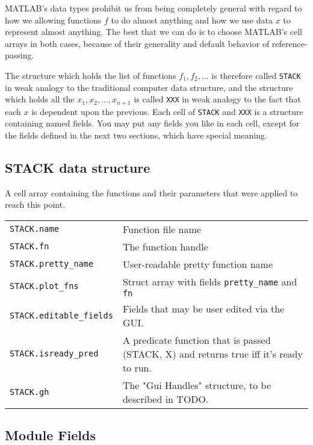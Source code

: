\documentclass{article}
\newcommand{\matlab}[1]{\texttt{#1}}
\begin{document}
MATLAB's data types prohibit us from being completely general with regard to how we allowing functions $f$ to do almost anything and how we use data $x$ to represent almost anything. The best that we can do is to choose MATLAB's cell arrays in both cases, because of their generality and default behavior of reference-passing.

The structure which holds the list of functions $f_1, f_2, ...$ is therefore called \matlab{STACK} in weak analogy to the traditional computer data structure, and the structure which holds all the $x_1, x_2, ..., x_{n+1}$ is called \matlab{XXX} in weak analogy to the fact that each $x$ is dependent upon the previous. Each cell of \matlab{STACK} and \matlab{XXX} is a structure containing named fields. You may put any fields you like in each cell, except for the fields defined in the next two sections, which have special meaning.

\subsection{STACK data structure}

  A cell array containing the functions and their parameters that were applied to reach this point. 

\begin{tabular}{l|p{4in}}
\matlab{STACK{}.name} & Function file name \\
\matlab{STACK{}.fn}             &  The function handle\\
\matlab{STACK{}.pretty\_name}    &  User-readable pretty function name\\
\matlab{STACK{}.plot\_fns}       &  Struct array with fields \matlab{pretty\_name} and \matlab{fn}  \\
\matlab{STACK{}.editable\_fields} & Fields that may be user edited via the GUI.\\
\matlab{STACK{}.isready\_pred}    &  A predicate function that is passed (STACK, X) and returns true iff it's ready to run.\\
\matlab{STACK{}.gh}              & The "Gui Handles" structure, to be described in TODO.\\
\end{tabular}

\subsection{Module Fields}
\end{document}
